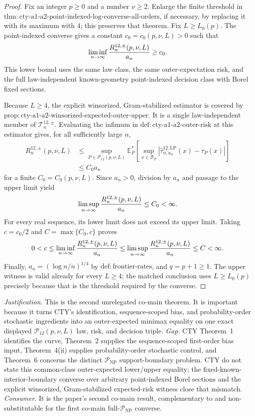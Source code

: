 \documentclass{article}
\begin{document}
\begin{proof}
Fix an integer \(p\geq0\) and a number \(\nu\geq2\).  Enlarge the finite threshold in \(\mathrm{thm:cty\text{-}a1\text{-}a2\text{-}point\text{-}indexed\text{-}log\text{-}converse\text{-}all\text{-}orders}\), if necessary, by replacing it with its maximum with \(4\); this preserves that theorem.  Fix \(L\geq L_0(p)\).  The point-indexed converse gives a constant \(c_0=c_0(p,\nu,L)>0\) such that
\[
 \liminf_{n\to\infty}{R_n^{12,\pm}(p,\nu,L)\over a_n}\geq c_0.
\]
This lower bound uses the same law class, the same outer-expectation risk, and the full law-independent known-geometry point-indexed decision class with Borel fixed sections.

Because \(L\geq4\), the explicit winsorized, Gram-stabilized estimator is covered by \(\mathrm{prop:cty\text{-}a1\text{-}a2\text{-}winsorized\text{-}expected\text{-}outer\text{-}upper}\).  It is a single law-independent member of \(\mathcal T_n^{12,\pm}\).  Evaluating the infimum in \(\mathrm{def:cty\text{-}a1\text{-}a2\text{-}outer\text{-}risk}\) at this estimator gives, for all sufficiently large \(n\),
\[
\begin{split}
 R_n^{12,\pm}(p,\nu,L)
 &\leq \sup_{P\in\mathcal P_{12}(p,\nu,L)}
 \mathbb E_P^*\!\left[
 \sup_{x\in\mathcal B_P}
 |\widehat\tau^{12,\mathrm{LP}}_{n,a_n}(x)-\tau_P(x)|
 \right]\\
 &\leq C_0a_n
\end{split}
\]
for a finite \(C_0=C_0(p,\nu,L)\).  Since \(a_n>0\), division by \(a_n\) and passage to the upper limit yield
\[
 \limsup_{n\to\infty}{R_n^{12,\pm}(p,\nu,L)\over a_n}\leq C_0<\infty.
\]
For every real sequence, its lower limit does not exceed its upper limit.  Taking \(c=c_0/2\) and \(C=\max\{C_0,c\}\) proves
\[
 0<c\leq\liminf_{n\to\infty}{R_n^{12,\pm}(p,\nu,L)\over a_n}
 \leq\limsup_{n\to\infty}{R_n^{12,\pm}(p,\nu,L)\over a_n}
 \leq C<\infty.
\]
Finally, \(a_n=(\log n/n)^{1/4}\) by \(\mathrm{def:frontier\text{-}rates}\), and \(q=p+1\geq1\).  The upper witness is valid already for every \(L\geq4\); the matched conclusion uses \(L\geq L_0(p)\) precisely because that is the threshold required by the converse.
\end{proof}
\par\smallskip\noindent \textit{Justification.} This is the second unrelegated co-main theorem.  It is important because it turns CTY's identification, sequence-scoped bias, and probability-order stochastic ingredients into an outer-expected minimax equality on one exact displayed \(\mathcal P_{12}(p,\nu,L)\) law, risk, and decision triple. \textit{Gap.} CTY Theorem~1 identifies the curve, Theorem~2 supplies the sequence-scoped first-order bias input, Theorem~4(ii) supplies probability-order stochastic control, and Theorem~6 concerns the distinct \(\mathcal P_{\mathrm{NP}}\) support-boundary problem.  CTY do not state this common-class outer-expected lower/upper equality; the fixed-known-interior-boundary converse over arbitrary point-indexed Borel sections and the explicit winsorized, Gram-stabilized expected-risk witness close that mismatch. \textit{Consumer.} It is the paper's second co-main result, complementary to and non-substitutable for the first co-main full-\(\mathcal P_{\mathrm{NP}}\) converse.
\end{document}

